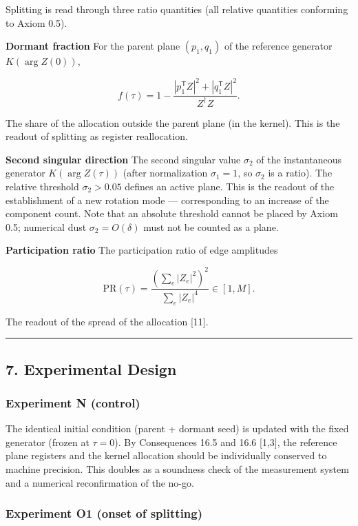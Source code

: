 \documentclass[
  a4paper,
]{article}
\begin{document}
Splitting is read through three ratio quantities (all relative
quantities conforming to Axiom 0.5).

\textbf{Dormant fraction} For the parent plane \((p_1,q_1)\) of the
reference generator \(K(\arg Z(0))\),

\[
f(\tau)=1-\frac{|p_1^{\mathsf T}Z|^2+|q_1^{\mathsf T}Z|^2}{Z^{\dagger}Z}.
\]

The share of the allocation outside the parent plane (in the kernel).
This is the readout of splitting as register reallocation.

\textbf{Second singular direction} The second singular value
\(\sigma_2\) of the instantaneous generator \(K(\arg Z(\tau))\) (after
normalization \(\sigma_1=1\), so \(\sigma_2\) is a ratio). The relative
threshold \(\sigma_2>0.05\) defines an active plane. This is the readout
of the establishment of a new rotation mode --- corresponding to an
increase of the component count. Note that an absolute threshold cannot
be placed by Axiom 0.5; numerical dust \(\sigma_2=O(\delta)\) must not
be counted as a plane.

\textbf{Participation ratio} The participation ratio of edge amplitudes

\[
\mathrm{PR}(\tau)=\frac{\left(\sum_e|Z_e|^2\right)^2}{\sum_e|Z_e|^4}\in[1,M].
\]

The readout of the spread of the allocation {[}11{]}.

\begin{center}\rule{0.5\linewidth}{0.5pt}\end{center}

\subsection{7. Experimental Design}\label{experimental-design}

\subsubsection{Experiment N (control)}\label{experiment-n-control}

The identical initial condition (parent + dormant seed) is updated with
the fixed generator (frozen at \(\tau=0\)). By Consequences 16.5 and
16.6 {[}1,3{]}, the reference plane registers and the kernel allocation
should be individually conserved to machine precision. This doubles as a
soundness check of the measurement system and a numerical reconfirmation
of the no-go.

\subsubsection{Experiment O1 (onset of
splitting)}\label{experiment-o1-onset-of-splitting}
\end{document}
